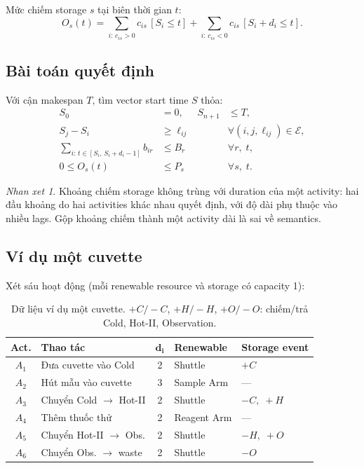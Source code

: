 \documentclass[11pt,a4paper]{article}
\theoremstyle{remark}
\newtheorem{remark}[theorem]{Nhan xet}
\begin{document}
Mức chiếm storage $s$ tại biên thời gian $t$:
\begin{equation}
  O_s(t) =
  \sum_{i:\,c_{is}>0} c_{is}\,[S_i \le t]
  + \sum_{i:\,c_{is}<0} c_{is}\,[S_i + d_i \le t].
  \label{eq:storage-level}
\end{equation}

\subsection{Bài toán quyết định}

Với cận makespan $T$, tìm vector start time $S$ thỏa:
\begin{align}
  S_0 &= 0, & S_{n+1} &\le T, \label{eq:dummy}\\
  S_j - S_i &\ge \ell_{ij} && \forall (i,j,\ell_{ij}) \in \mathcal{E},
    \label{eq:prec}\\
  \sum_{i:\,t \in [S_i,\,S_i+d_i-1]} b_{ir} &\le B_r
    && \forall r,\; t, \label{eq:renewable}\\
  0 \le O_s(t) &\le P_s && \forall s,\; t. \label{eq:storage}
\end{align}

\begin{remark}
Khoảng chiếm storage không trùng với duration của một activity:
hai đầu khoảng do hai activities khác nhau quyết định, với độ dài phụ thuộc
vào nhiều lags. Gộp khoảng chiếm thành một activity dài là sai về semantics.
\end{remark}

\subsection{Ví dụ một cuvette}
\label{sec:example}

Xét sáu hoạt động (mỗi renewable resource và storage có capacity 1):

\begin{table}[htbp]
\centering
\caption{Dữ liệu ví dụ một cuvette. $+C/-C$, $+H/-H$, $+O/-O$: chiếm/trả
  Cold, Hot-II, Observation.}
\label{tab:example}
\begin{tabularx}{\textwidth}{@{}cYcp{0.20\textwidth}p{0.20\textwidth}@{}}
\toprule
\textbf{Act.} & \textbf{Thao tác} & $\boldsymbol{d_i}$ &
\textbf{Renewable} & \textbf{Storage event}\\
\midrule
$A_1$ & Đưa cuvette vào Cold   & 2 & Shuttle     & $+C$\\
$A_2$ & Hút mẫu vào cuvette    & 3 & Sample Arm  & ---\\
$A_3$ & Chuyển Cold $\to$ Hot-II   & 2 & Shuttle     & $-C,\;+H$\\
$A_4$ & Thêm thuốc thử         & 2 & Reagent Arm & ---\\
$A_5$ & Chuyển Hot-II $\to$ Obs.   & 2 & Shuttle     & $-H,\;+O$\\
$A_6$ & Chuyển Obs. $\to$ waste    & 2 & Shuttle     & $-O$\\
\bottomrule
\end{tabularx}
\end{table}
\end{document}
